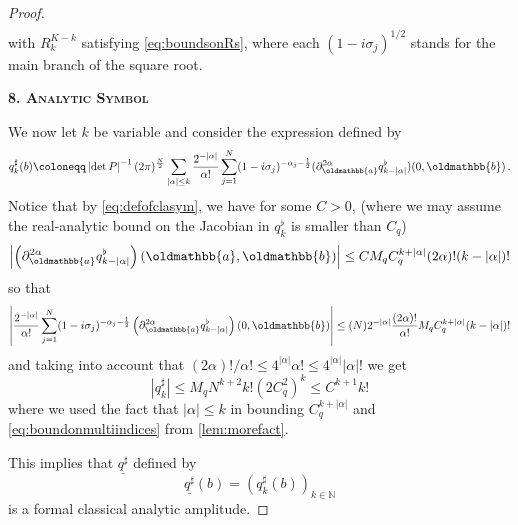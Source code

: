 \documentclass[
	fontsize=11pt, 
	twoside=false, 
	abstract=true, 
	a4paper,
]{scrartcl}
\newcommand{\eps}{\varepsilon}
\newcommand{\abs}[1]{\left\lvert#1\right\rvert}
\newcommand{\del}{\partial}
\newcommand{\ud}[1]{\underline{#1}}
\newcommand{\mf}[1]{\oldmathbb{#1}}
\newcommand{\bsc}[1]{\textbf{\ebgaramond\textsc{#1}}}
\begin{document}
\begin{proof}
\begin{equation}
\begin{aligned}
	\end{aligned}
	\end{equation}
	with $R_k^{K-k}$ satisfying \cref{eq:boundsonRs}, where each $(1-i\sigma_j)^{1/2}$ stands for the main branch of the square root.

	\bsc{8. Analytic Symbol}
	
	We now let $k$ be variable and consider the expression defined by
	\begin{equation}\label{eq:defofasharp}
		q^\sharp_{k}(b) \coloneqq \abs{\det P}^{-1}(2\pi)^{\frac{N}{2}}\sum_{\abs{\alpha} \leq k}\frac{2^{-\abs{\alpha}}}{\alpha!}\sum_{j=1}^{N}(1-i\sigma_j)^{-\alpha_j-\frac{1}{2}}(\del_{\mf{a}}^{2\alpha} q^\flat_{k-\abs{\alpha}})(0,\mf{b})\,.
	\end{equation}
	Notice that by \cref{eq:defofclasym}, we have for some $C>0$, %
	(where we may assume the real-analytic bound on the Jacobian in $q^\flat_k$ is smaller than $C_q$)
	\[
		\abs{\left(\del_{\mf{a}}^{2\alpha} q^\flat_{k-\abs{\alpha}}\right)(\mf{a},\mf{b})} \leq C M_q C_q^{k+\abs{\alpha}} (2\alpha)!(k-\abs{\alpha})!
	\]
	so that
	\[
		\abs{\frac{2^{-\abs{\alpha}}}{\alpha!}\sum_{j=1}^{N}(1-i\sigma_j)^{-\alpha_j-\frac{1}{2}}\left(\del_{\mf{a}}^{2\alpha} q^\flat_{k-\abs{\alpha}}\right)(0,\mf{b})} \leq (N)2^{-\abs{\alpha}}\frac{(2\alpha)!}{\alpha!}M_q C_q^{k+\abs{\alpha}}(k-\abs{\alpha})!
	\]
	and taking into account that $(2\alpha)!/\alpha! \leq 4^{\abs{\alpha}}\alpha!\leq 4^{\abs{\alpha}}\abs{\alpha}!$ we get 
	\[
		\abs{q^\sharp_{k}} \leq M_qN^{k+2}k!(2 C_q^2)^{k} \leq C^{k+1} k! 
	\]
	where we used the fact that $\abs{\alpha}\leq k$ in bounding $C_q^{k+\abs{\alpha}}$ and \cref{eq:boundonmultiindices} from \cref{lem:morefact}.

	This implies that $\ud{q^\sharp}$ defined by 
	\begin{equation}\label{eq:defineamp}
		\ud{q^\sharp}(b) = (q^\sharp_{k}(b))_{k\in\mathbb{N}}
	\end{equation}
	is a formal classical analytic amplitude. %


\end{proof}
\end{document}
